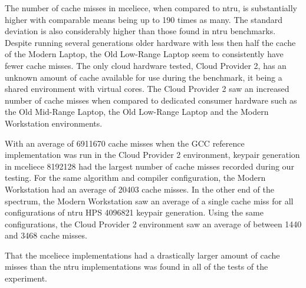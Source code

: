 The number of cache misses in \gls{mceliece}, when compared to \gls{ntru}, is substantially higher with comparable means being up to 190 times as many. The standard deviation is also considerably higher than those found in \gls{ntru} benchmarks. Despite running several generations older hardware with less then half the cache of the Modern Laptop, the Old Low-Range Laptop seem to consistently have fewer cache misses. The only cloud hardware tested, Cloud Provider 2, has an unknown amount of cache available for use during the benchmark, it being a shared environment with virtual cores. The Cloud Provider 2 saw an increased number of cache misses when compared to dedicated consumer hardware such as the Old Mid-Range Laptop, the Old Low-Range Laptop and the Modern Workstation environments.



With an average of 6911670 cache misses when the GCC reference implementation was run in the Cloud Provider 2 environment, keypair generation in \gls{mceliece} 8192128 had the largest number of cache misses recorded during our testing. For the same algorithm and compiler configuration, the Modern Workstation had an average of 20403 cache misses. In the other end of the spectrum, the Modern Workstation saw an average of a single cache miss for all configurations of \gls{ntru} HPS 4096821 keypair generation. Using the same configurations, the Cloud Provider 2 environment saw an average of between 1440 and 3468 cache misses. 

That the \gls{mceliece} implementations had a drastically larger amount of cache misses than the \gls{ntru} implementations was found in all of the tests of the experiment.

